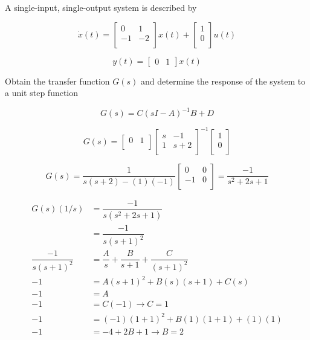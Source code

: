 \documentclass[11pt]{article}
\begin{document}
A single-input, single-output system is described by

\[
    \dot x(t) =
    \begin{bmatrix}
        0 & 1 \\
        -1 & -2 \\
    \end{bmatrix}
    x(t) +
    \begin{bmatrix}
        1 \\
        0 \\
    \end{bmatrix}
    u(t)
\]

\[ y(t) = \begin{bmatrix} 0 & 1 \end{bmatrix} x(t) \]

Obtain the transfer function $G(s)$ and determine the response of the system to a unit step function

\[ G(s) = C(sI - A)^{-1}B + D \]

\[
    G(s) =
    \begin{bmatrix}
        0 & 1 \\
    \end{bmatrix}
    \begin{bmatrix}
        s & -1 \\
        1 & s + 2 \\
    \end{bmatrix}^{-1}
    \begin{bmatrix}
        1 \\
        0 \\
    \end{bmatrix}
\]

\[
    G(s) =
    \dfrac{1}{s(s + 2) - (1)(-1)}
    \begin{bmatrix}
        0 & 0 \\
        -1 & 0 \\
    \end{bmatrix}
    = \dfrac{-1}{s^2 + 2s + 1}
\]

\begin{align*}
    G(s) (1/s) &= \dfrac{-1}{s(s^2 + 2s + 1)} \\
    &= \dfrac{-1}{s(s + 1)^2} \\
    \dfrac{-1}{s(s + 1)^2} &= \dfrac{A}{s} + \dfrac{B}{s + 1} + \dfrac{C}{(s + 1)^2} \\
    -1 &= A (s + 1)^2 + B (s) (s + 1) + C (s) \\
    -1 &= A \tag{$s = 0$} \\
    -1 &= C (-1) \xrightarrow{} C = 1 \tag{$s = -1$} \\
    -1 &= (-1) (1 + 1)^2 + B (1) (1 + 1) + (1) (1) \tag{$s = 1$} \\
    -1 &= -4 + 2B + 1 \xrightarrow{} B = 2 \\
\end{align*}
\end{document}

